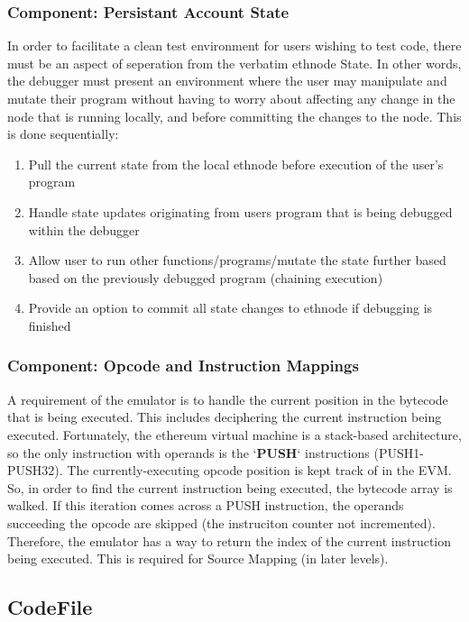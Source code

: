 \documentclass{report}
\begin{document}
    \subsubsection{Component: Persistant Account State}
        In order to facilitate a clean test environment for users wishing to test code, there must be an aspect of seperation from the verbatim \Gls{ethnode} State. In other words, the debugger must present an environment where the user may manipulate and mutate their program without having to worry about affecting any change in the node that is running locally, and before committing the changes to the node. This is done sequentially:
        \begin{enumerate}
            \item Pull the current state from the local \Gls{ethnode} before execution of the user's program
            \item Handle state updates originating from users program that is being debugged within the debugger
            \item Allow user to run other functions/programs/mutate the state further based based on the previously debugged program (chaining execution)
            \item Provide an option to commit all state changes to \Gls{ethnode} if debugging is finished
        \end{enumerate}

    \subsubsection{Component: Opcode and Instruction Mappings}
        A requirement of the emulator is to handle the current position in the bytecode that is being executed. This includes deciphering the current instruction being executed. Fortunately, the \Gls{ethereum} virtual machine is a stack-based architecture, so the only instruction with operands is the `\textbf{PUSH}` instructions (PUSH1-PUSH32). The currently-executing opcode position is kept track of in the EVM. So, in order to find the current instruction being executed, the bytecode array is walked. If this iteration comes across a PUSH instruction, the operands succeeding the opcode are skipped (the instruciton counter not incremented). Therefore, the emulator has a way to return the index of the current instruction being executed. This is required for Source Mapping (in later levels).

\subsection{CodeFile}
\end{document}
